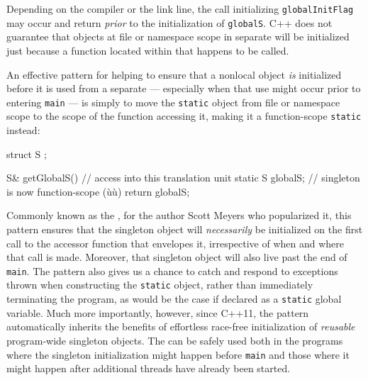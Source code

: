 \noindent Depending on the compiler or the link line, the call
initializing \lstinline!globalInitFlag! may occur and return \emph{prior}
to the initialization of  \lstinline!globalS!.  C++ does not guarantee that objects at
file or namespace scope in separate  will be
initialized just because a function located within that 
happens to be called.

An effective pattern for helping to ensure that a nonlocal object
\emph{is} initialized before it is used from a separate 
--- especially when that use might occur prior to entering \lstinline!main!
--- is simply to move the \lstinline!static! object from file or namespace
scope to the scope of the function accessing it, making it a
function-scope \lstinline!static! instead:

\begin{emcppshiddenlisting}[emcppsbatch=e8]
struct S {
};
\end{emcppshiddenlisting}
\begin{emcppslisting}[emcppsbatch=e8]
S& getGlobalS()  // access into this translation unit
{
    static S globalS;  // singleton is now function-scope (ù{}ù)
    return globalS;
}
\end{emcppslisting}

\noindent Commonly known as the , for the
author Scott Meyers who popularized it, this pattern ensures that the
singleton object will \emph{necessarily} be initialized on the first
call to the accessor function that envelopes it, irrespective of when
and where that call is made. Moreover, that singleton object will also
live past the end of \lstinline!main!. The  pattern also gives us a chance to catch and respond to
exceptions thrown when constructing the \lstinline!static! object, rather
than immediately terminating the program, as would be the case if declared as a
\lstinline!static! global variable. Much more importantly, however, since C++11, the
 pattern automatically inherits the benefits of
effortless race-free initialization of \emph{reusable} program-wide
singleton objects.  The  can be safely used
both in the programs where the singleton initialization might happen before \lstinline!main!
and those where it might happen after additional threads have already been started.
\newpage%

